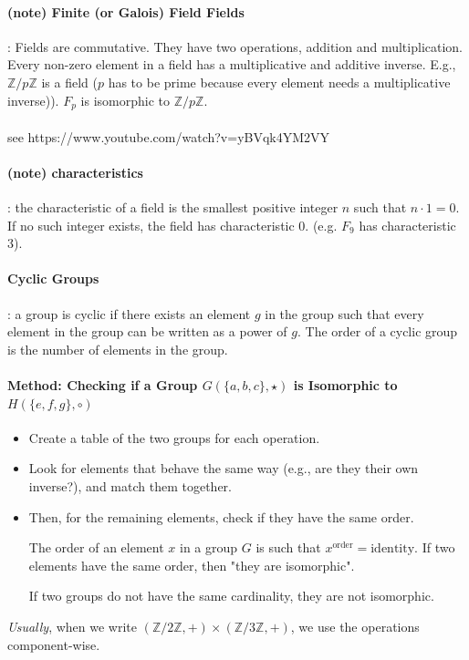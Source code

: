 \documentclass{article}
\begin{document}
\paragraph{(note) Finite (or Galois) Field Fields}: Fields are commutative. They have two operations, addition and multiplication. Every non-zero element in a field has a multiplicative and additive inverse. E.g., \(\mathbb{Z}/p\mathbb{Z}\) is a field ($p$ has to be prime because every element needs a multiplicative inverse)). $F_p$ is isomorphic to $\mathbb{Z}/p\mathbb{Z}$.\\\\
see https://www.youtube.com/watch?v=yBVqk4YM2VY

\paragraph{(note)  characteristics}: the characteristic of a field is the smallest positive integer \( n \) such that \( n \cdot 1 = 0 \). If no such integer exists, the field has characteristic 0. (e.g. \(F_9\) has characteristic 3).

\paragraph{Cyclic Groups}: a group is cyclic if there exists an element \( g \) in the group such that every element in the group can be written as a power of \( g \). The order of a cyclic group is the number of elements in the group.

\paragraph{Method: Checking if a Group \( G(\{a, b, c\}, \star) \) is Isomorphic to \( H(\{e, f, g\}, \circ) \)}

\begin{itemize}
    \item Create a table of the two groups for each operation.
    \item Look for elements that behave the same way (e.g., are they their own inverse?), and match them together.
    \item Then, for the remaining elements, check if they have the same order.

    The order of an element \( x \) in a group \( G \) is such that \( x^{\text{order}} = \text{identity} \). If two elements have the same order, then "they are isomorphic".

    If two groups do not have the same cardinality, they are not isomorphic.
\end{itemize}
\textit{Usually}, when we write \( (\mathbb{Z}/2\mathbb{Z}, +) \times (\mathbb{Z}/3\mathbb{Z}, +) \), we use the operations component-wise.
\end{document}
